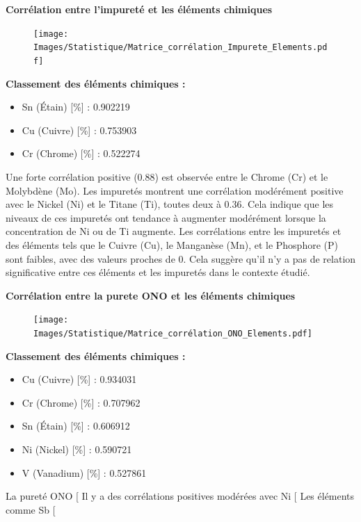 \documentclass[12pt]{article}
\begin{document}

\textbf{Corrélation entre l'impureté et les éléments chimiques} 

\begin{figure}[H]
    \texttt{[image: Images/Statistique/Matrice\_corrélation\_Impurete\_Elements.pdf]} 
\end{figure}

\textbf{Classement des éléments chimiques :}
\begin{itemize}
    \item Sn (Étain) [\%] : 0.902219
    \item Cu (Cuivre) [\%] : 0.753903
    \item Cr (Chrome) [\%] : 0.522274
\end{itemize}


Une forte corrélation positive (0.88) est observée entre le Chrome (Cr) et le Molybdène (Mo). 
Les impuretés montrent une corrélation modérément positive avec le Nickel (Ni) et le Titane (Ti), toutes deux à 0.36. Cela indique que les niveaux de ces impuretés ont tendance à augmenter modérément lorsque la concentration de Ni ou de Ti augmente.
Les corrélations entre les impuretés et des éléments tels que le Cuivre (Cu), le Manganèse (Mn), et le Phosphore (P) sont faibles, avec des valeurs proches de 0. Cela suggère qu'il n'y a pas de relation significative entre ces éléments et les impuretés dans le contexte étudié.



\textbf{Corrélation entre la purete ONO et les éléments chimiques}
\begin{figure}[H]
    \texttt{[image: Images/Statistique/Matrice\_corrélation\_ONO\_Elements.pdf]} 
\end{figure}

\textbf{Classement des éléments chimiques : }
\begin{itemize}
    \item Cu (Cuivre) [\%] : 0.934031
    \item Cr (Chrome) [\%] : 0.707962
    \item Sn (Étain) [\%] : 0.606912
    \item Ni (Nickel) [\%] : 0.590721
    \item V (Vanadium) [\%] : 0.527861
\end{itemize}

La pureté ONO [%
Il y a des corrélations positives modérées avec Ni [%
Les éléments comme Sb [%
\end{document}
